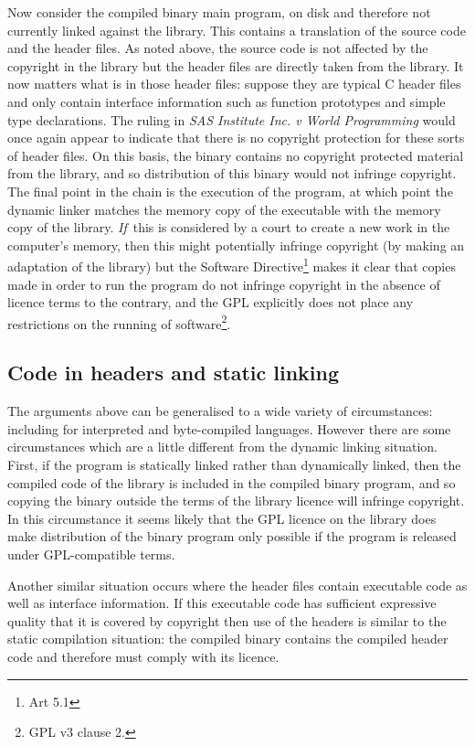 \documentclass[a4paper,12pt]{article}
\begin{document}
Now consider the compiled binary main program, on disk and therefore not
currently linked against the library. This contains a translation of the
source code and the header files. As noted above, the source code is not
affected by the copyright in the library but the header files are directly
taken from the library. It now matters what is in those header files:
suppose they are typical C header files and only contain interface
information such as function prototypes and simple type declarations. The
ruling in \textit{SAS Institute Inc. v World Programming} would once again
appear to indicate that there is no copyright protection for these sorts of
header files. On this basis, the binary contains no copyright protected
material from the library, and so distribution of this binary would not
infringe copyright. The final point in the chain is the execution of the
program, at which point the dynamic linker matches the memory copy of the
executable with the memory copy of the library. \emph{If}\ this is
considered by a court to create a new work in the computer's memory, then
this might potentially infringe copyright (by making an adaptation of the
library) but the Software Directive\footnote{Art 5.1} makes it clear that
copies made in order to run the program do not infringe copyright in the
absence of licence terms to the contrary, and the GPL explicitly does not
place any restrictions on the running of software\footnote{GPL v3 clause
  2.}.

\subsection{Code in headers and static linking}

The arguments above can be generalised to a wide variety of circumstances:
including for interpreted and byte-compiled languages. However there are
some circumstances which are a little different from the dynamic linking
situation. First, if the program is statically linked rather than
dynamically linked, then the compiled code of the library is included in the
compiled binary program, and so copying the binary outside the terms of the
library licence will infringe copyright. In this circumstance it seems
likely that the GPL licence on the library does make distribution of the
binary program only possible if the program is released under GPL-compatible
terms.

Another similar situation occurs where the header files contain executable
code as well as interface information. If this executable code has
sufficient expressive quality that it is covered by copyright then use of
the headers is similar to the static compilation situation: the compiled
binary contains the compiled header code and therefore must comply with its
licence. 
\end{document}
